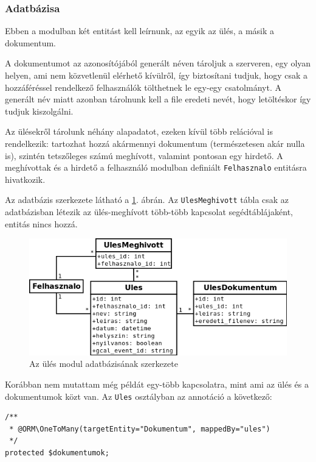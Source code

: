 \documentclass[a4paper,12pt,oneside]{report}
\begin{document}
\subsubsection*{Adatbázisa}

Ebben a modulban két entitást kell leírnunk, az egyik az ülés, a másik a dokumentum.

A dokumentumot az azonosítójából generált néven tároljuk a szerveren, egy olyan helyen, ami nem közvetlenül elérhető kívülről, így biztosítani tudjuk, hogy csak a hozzáféréssel rendelkező felhasználók tölthetnek le egy-egy csatolmányt. A generált név miatt azonban tárolnunk kell a file eredeti nevét, hogy letöltéskor így tudjuk kiszolgálni.

Az ülésekről tárolunk néhány alapadatot, ezeken kívül több relációval is rendelkezik: tartozhat hozzá akármennyi dokumentum (természetesen akár nulla is), szintén tetszőleges számú meghívott, valamint pontosan egy hirdető. A meghívottak és a hirdető a felhasználó modulban definiált {\tt Felhasznalo} entitásra hivatkozik.

Az adatbázis szerkezete látható a \ref{fig:ules_db}. ábrán. Az {\tt UlesMeghivott} tábla csak az adatbázisban létezik az ülés-meghívott több-több kapcsolat segédtáblájaként, entitás nincs hozzá.

\begin{figure}[h]
    \includegraphics[width=\textwidth]{ules_db.png}
    \caption{Az ülés modul adatbázisának szerkezete}
    \label{fig:ules_db}
\end{figure}

Korábban nem mutattam még példát egy-több kapcsolatra, mint ami az ülés és a dokumentumok közt van. Az {\tt Ules} osztályban az annotáció a következő:

\begin{lstlisting}
/**
 * @ORM\OneToMany(targetEntity="Dokumentum", mappedBy="ules")
 */
protected $dokumentumok;
\end{lstlisting}
\end{document}
